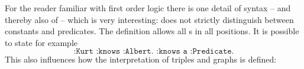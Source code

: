 For the reader familiar with first order logic there is one detail of \rdf{} syntax -- and thereby also of \nthree{} -- which is very interesting: \rdf does not strictly distinguish between 
constants and predicates. The definition allows all \iri{}s in all positions. It is possible to state for example
\begin{equation}\label{urisubpred}
\texttt{ :Kurt :knows :Albert. :knows a :Predicate. }
\end{equation}
This also influences how the interpretation of \rdf triples and graphs is defined:






